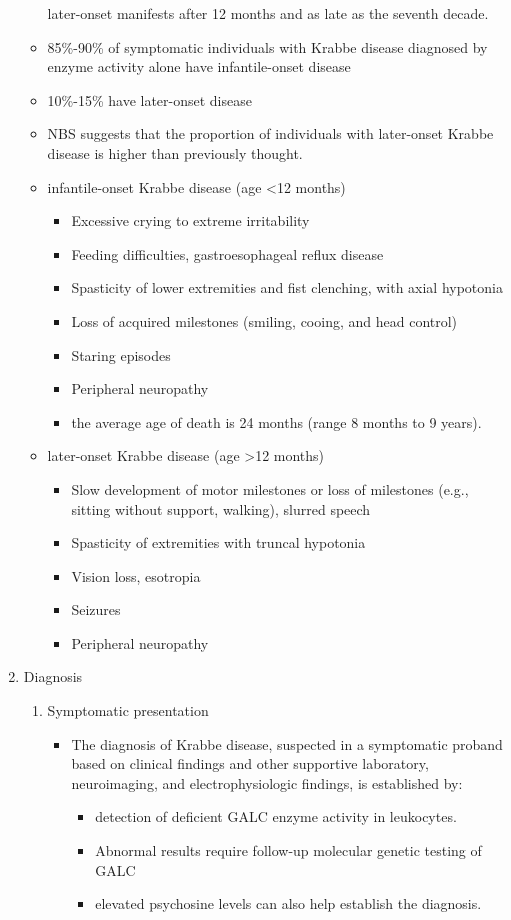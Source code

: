\documentclass{scrartcl}
\begin{document}
\begin{enumerate}
\begin{itemize}
\item[{later-onset}] manifests after 12 months and as late as the seventh
decade.

\item 85\%-90\% of symptomatic individuals with Krabbe disease diagnosed by enzyme activity alone have infantile-onset disease
\item 10\%-15\% have later-onset disease
\item NBS suggests that the proportion of individuals with later-onset
Krabbe disease is higher than previously thought.

\item infantile-onset Krabbe disease (age <12 months)
\begin{itemize}
\item Excessive crying to extreme irritability
\item Feeding difficulties, gastroesophageal reflux disease
\item Spasticity of lower extremities and fist clenching, with axial hypotonia
\item Loss of acquired milestones (smiling, cooing, and head control)
\item Staring episodes
\item Peripheral neuropathy
\item the average age of death is 24 months (range 8 months to 9 years).
\end{itemize}

\item later-onset Krabbe disease (age >12 months)
\begin{itemize}
\item Slow development of motor milestones or loss of milestones (e.g.,
sitting without support, walking), slurred speech
\item Spasticity of extremities with truncal hypotonia
\item Vision loss, esotropia
\item Seizures
\item Peripheral neuropathy
\end{itemize}
\end{itemize}

\item Diagnosis
\label{sec:org7f5d01f}
\begin{enumerate}
\item Symptomatic presentation
\label{sec:org6768d73}
\begin{itemize}
\item The diagnosis of Krabbe disease, suspected in a symptomatic proband
based on clinical findings and other supportive laboratory,
neuroimaging, and electrophysiologic findings, is established by:
\begin{itemize}
\item detection of deficient GALC enzyme activity in leukocytes.
\item Abnormal results require follow-up molecular genetic testing of GALC
\item elevated psychosine levels can also help establish the diagnosis.
\end{itemize}
\end{itemize}


\end{enumerate}
\end{enumerate}
\end{document}

